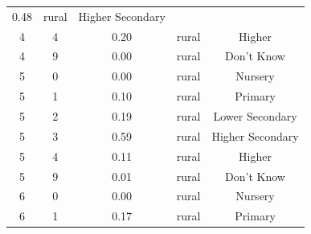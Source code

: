 \documentclass[stu, 12pt, floatsintext,longtable]{apa7}
\begin{document}
\begin{longtable}{ccccc}
    0.48                                               &
    rural                                              & Higher Secondary
    \\
    4                                                  & 4                    &
    0.20                                               &
    rural                                              & Higher
    \\
    4                                                  & 9                    &
    0.00                                               &
    rural                                              & Don't Know
    \\
    5                                                  & 0                    &
    0.00                                               &
    rural                                              & Nursery
    \\
    5                                                  & 1                    &
    0.10                                               &
    rural                                              & Primary
    \\
    5                                                  & 2                    &
    0.19                                               &
    rural                                              & Lower Secondary
    \\
    5                                                  & 3                    &
    0.59                                               &
    rural                                              & Higher Secondary
    \\
    5                                                  & 4                    &
    0.11                                               &
    rural                                              & Higher
    \\
    5                                                  & 9                    &
    0.01                                               &
    rural                                              & Don't Know
    \\
    6                                                  & 0                    &
    0.00                                               &
    rural                                              & Nursery
    \\
    6                                                  & 1                    &
    0.17                                               &
    rural                                              & Primary

\end{longtable}
\end{document}
